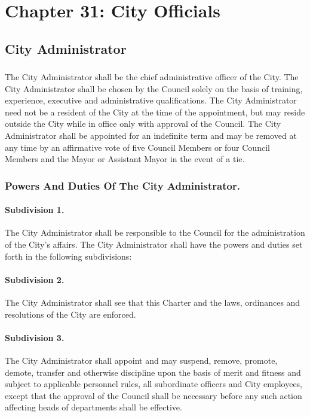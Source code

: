 %
\chapter*{Chapter 31: \newline
	City Officials}

\section{City Administrator}
\subsection{}
The City Administrator shall be the chief administrative officer of the City. The City Administrator shall be chosen by the Council solely on the basis of training, experience, executive and administrative qualifications. The City Administrator need not be a resident of the City at the time of the appointment, but may reside outside the City while in office only with approval of the Council. The City Administrator shall be appointed for an indefinite term and may be removed at any time by an affirmative vote of five Council Members or four Council Members and the Mayor or Assistant Mayor in the event of a tie.
\subsection{Powers And Duties Of The City Administrator.}
\subsubsection*{Subdivision 1.}
The City Administrator shall be responsible to the Council for the administration of the City’s affairs. The City Administrator shall have the powers and duties set forth in the following subdivisions:
\subsubsection*{Subdivision 2.}
The City Administrator shall see that this Charter and the laws, ordinances and resolutions of the City are enforced.
\subsubsection*{Subdivision 3.}
The City Administrator shall appoint and may suspend, remove, promote, demote, transfer and otherwise discipline upon the basis of merit and fitness and subject to applicable personnel rules, all subordinate officers and City employees, except that the approval of the Council shall be necessary before any such action affecting heads of departments shall be effective.
